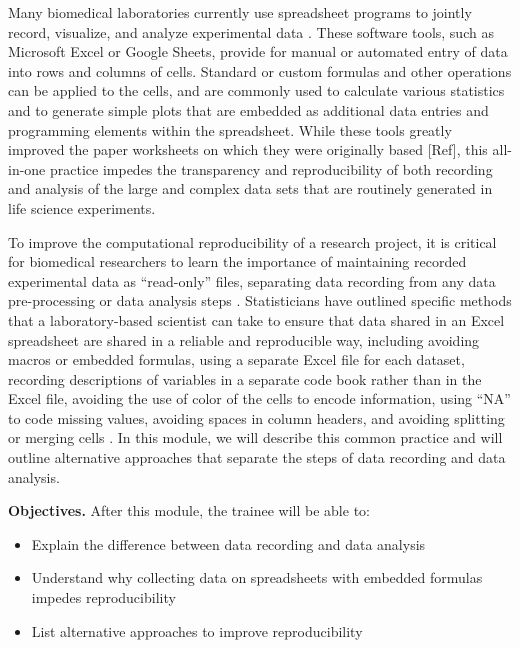 \documentclass[]{tufte-book}
\providecommand{\tightlist}{%
  \setlength{\itemsep}{0pt}\setlength{\parskip}{0pt}}
\begin{document}
Many biomedical laboratories currently use spreadsheet programs to jointly
record, visualize, and analyze experimental data \citep{broman2018data}. These
software tools, such as Microsoft Excel or Google Sheets, provide for manual or
automated entry of data into rows and columns of cells. Standard or custom
formulas and other operations can be applied to the cells, and are commonly
used to calculate various statistics and to generate simple plots that
are embedded as additional data entries and programming elements within the
spreadsheet. While these tools greatly improved the paper worksheets on which
they were originally based {[}Ref{]}, this all-in-one practice impedes the
transparency and reproducibility of both recording and analysis of the
large and complex data sets that are routinely generated in life science
experiments.

To improve the computational reproducibility of a research project, it is critical
for biomedical researchers
to learn the importance of maintaining recorded experimental data as ``read-only''
files, separating data recording from any data pre-processing or data analysis
steps \citep{broman2018data, marwick2018packaging}. Statisticians have outlined
specific methods that a laboratory-based scientist can take to ensure that data
shared in an Excel spreadsheet are shared in a reliable and reproducible way,
including avoiding macros or embedded formulas, using a separate Excel file for
each dataset, recording descriptions of variables in a separate code book rather
than in the Excel file, avoiding the use of color of the cells to encode
information, using ``NA'' to code missing values, avoiding spaces in column
headers, and avoiding splitting or merging cells \citep{ellis2018share, broman2018data}. In this module, we will describe this common practice and will
outline alternative approaches that separate the steps of data recording and
data analysis.

\textbf{Objectives.} After this module, the trainee will be able to:

\begin{itemize}
\tightlist
\item
  Explain the difference between data recording and data analysis
\item
  Understand why collecting data on spreadsheets with embedded formulas impedes
  reproducibility
\item
  List alternative approaches to improve reproducibility
\end{itemize}
\end{document}
